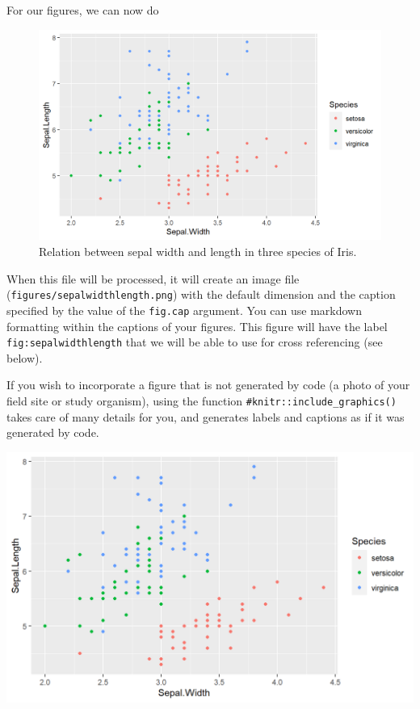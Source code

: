 \documentclass[
]{book}
\theoremstyle{definition}
\theoremstyle{definition}
\theoremstyle{definition}
\theoremstyle{definition}
\theoremstyle{remark}
\begin{document}
For our figures, we can now do

\begin{figure}

{\centering \includegraphics{figures/sepalwidthlength-1} 

}

\caption{Relation between sepal width and length in three species of Iris.}\label{fig:sepalwidthlength}
\end{figure}

When this file will be processed, it will create an image file (\texttt{figures/sepalwidthlength.png}) with the default dimension and the caption specified by the value of the \texttt{fig.cap} argument. You can use markdown formatting within the captions of your figures. This figure will have the label \texttt{fig:sepalwidthlength} that we will be able to use for cross referencing (see below).

If you wish to incorporate a figure that is not generated by code (a photo of your field site or study organism), using the function \texttt{\#knitr::include\_graphics()} takes care of many details for you, and generates labels and captions as if it was generated by code.

\begin{center}\includegraphics[width=17.33in]{figures/iris} \end{center}
\end{document}
